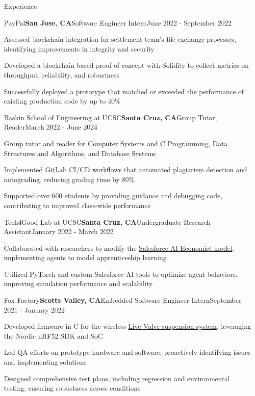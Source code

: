 \documentclass{resume}
\begin{document}
\begin{rSection}{\large Experience}

\begin{rSubsection}{PayPal}{\bf{San Jose, CA}}{Software Engineer Intern}{June 2022 - September 2022}
\item Assessed blockchain integration for settlement team's file exchange processes, identifying improvements in integrity and security
\item Developed a blockchain-based proof-of-concept with Solidity to collect metrics on throughput, reliability, and robustness
\item Successfully deployed a prototype that matched or exceeded the performance of existing production code by up to 40\%
\end{rSubsection}

\begin{rSubsection}{Baskin School of Engineering at UCSC}{\bf{Santa Cruz, CA}}{Group Tutor, Reader}{March 2022 - June 2024}
\item Group tutor and reader for Computer Systems and C Programming, Data Structures and Algorithms, and Database Systems
\item Implemented GitLab CI/CD workflows that automated plagiarism detection and autograding, reducing grading time by 80\%
\item Supported over 600 students by providing guidance and debugging code, contributing to improved class-wide performance
\end{rSubsection}

\begin{rSubsection}{Tech4Good Lab at UCSC}{\bf{Santa Cruz, CA}}{Undergraduate Research Assistant}{January 2022 - March 2022}

\item Collaborated with researchers to modify the \href{https://github.com/salesforce/ai-economist}{Salesforce AI Economist model}, implementing agents to model apprenticeship learning
\item Utilized PyTorch and custom Salesforce AI tools to optimize agent behaviors, improving simulation performance and scalability
\end{rSubsection}

\begin{rSubsection}{Fox Factory}{\bf{Scotts Valley, CA}}{Embedded Software Engineer Intern}{September 2021 - January 2022}
\item Developed firmware in C for the wireless \href{https://www.pinkbike.com/news/fox-updates-live-valve-electonic-suspension-for-2022.html}{Live Valve suspension system}, leveraging the Nordic nRF52 SDK and SoC
\item Led QA efforts on prototype hardware and software, proactively identifying issues and implementing solutions
\item Designed comprehensive test plans, including regression and environmental testing, ensuring robustness across conditions
\end{rSubsection}
\end{rSection}
\end{document}

